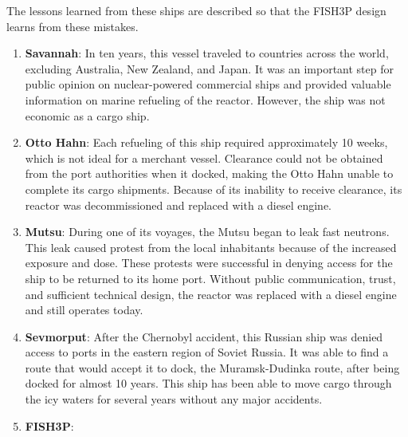 \documentclass[12pt]{article}
\begin{document}
The lessons learned from these ships are described so that the FISH3P design learns from these mistakes.

\begin{enumerate}
\item \textbf{Savannah}: \newline
In ten years, this vessel traveled to countries across the world, excluding Australia, New Zealand, and Japan.  It was an important step for public opinion on nuclear-powered commercial ships and provided valuable information on marine refueling of the reactor.  However, the ship was not economic as a cargo ship.  
\item \textbf{Otto Hahn}: \newline
Each refueling of this ship required approximately 10 weeks, which is not ideal for a merchant vessel.  Clearance could not be obtained from the port authorities when it docked, making the Otto Hahn unable to complete its cargo shipments.  Because of its inability to receive clearance, its reactor was decommissioned and replaced with a diesel engine.  
\item \textbf{Mutsu}: \newline
During one of its voyages, the Mutsu began to leak fast neutrons.  This leak caused protest from the local inhabitants because of the increased exposure and dose.  These protests were successful in denying access for the ship to be returned to its home port.  Without public communication, trust, and sufficient technical design, the reactor was replaced with a diesel engine and still operates today.
\item \textbf{Sevmorput}: \newline
After the Chernobyl accident, this Russian ship was denied access to ports in the eastern region of Soviet Russia.  It was able to find a route that would accept it to dock, the Muramsk-Dudinka route, after being docked for almost 10 years.  This ship has been able to move cargo through the icy waters for several years without any major accidents. 
\item \textbf{FISH3P}: \newline

\end{enumerate}
\end{document}
